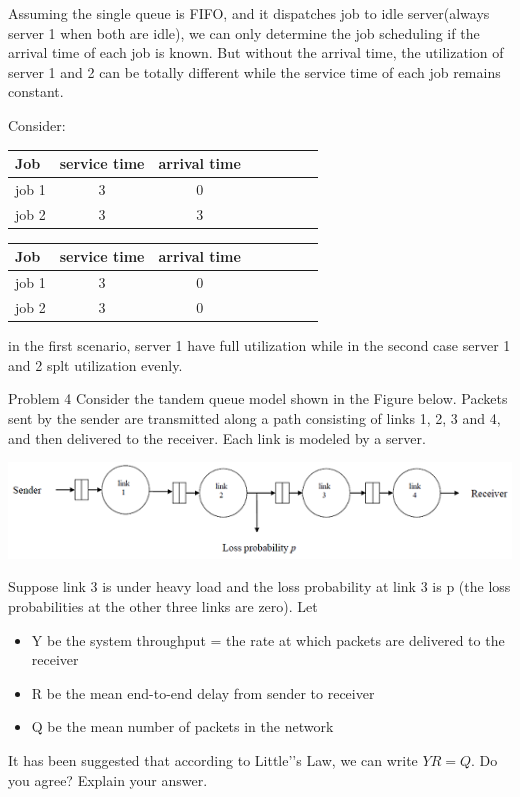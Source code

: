 \documentclass[12pt]{article}
\begin{document}
\begin{enumerate}
\begin{enumerate}
Assuming the single queue is FIFO, and it dispatches job to idle server(always server 1 when both are idle), we can only determine the job scheduling if the arrival time of each job is known. But without the arrival time, the utilization of server 1 and 2 can be totally different while the service time of each job remains constant.

Consider:

\begin{tabular}{l*{6}{c}r}
Job              & service time & arrival time \\
\hline
job 1            & 3 & 0 \\
job 2            & 3 & 3 \\
\end{tabular}

\begin{tabular}{l*{6}{c}r}
Job              & service time & arrival time \\
\hline
job 1            & 3 & 0 \\
job 2            & 3 & 0 \\
\end{tabular}

in the first scenario, server 1 have full utilization while in the second case server 1 and 2 splt utilization evenly.

\end{enumerate}

\begin{minipage}{\textwidth}
\item{Problem 4}
Consider the tandem queue model shown in the Figure below. Packets sent by the sender are transmitted along a path consisting of links 1, 2, 3 and 4, and then delivered to the receiver. Each link is modeled by a server.

\includegraphics{a1q4.png}
\end{minipage}
Suppose link 3 is under heavy load and the loss probability at link 3 is p (the loss probabilities at the
other three links are zero). Let
\begin{itemize}
\item{} Y be the system throughput = the rate at which packets are delivered to the receiver
\item{} R be the mean end-to-end delay from sender to receiver
\item{} Q be the mean number of packets in the network
\end{itemize}
It has been suggested that according to Little'’s Law, we can write $YR = Q$. Do you agree? Explain your answer.


\end{enumerate}
\end{document}
